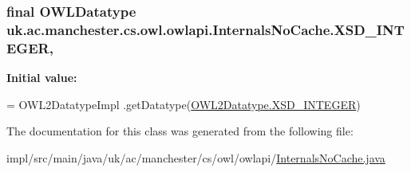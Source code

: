 \hypertarget{classuk_1_1ac_1_1manchester_1_1cs_1_1owl_1_1owlapi_1_1_internals_no_cache_a5109b60810d72a1a3f0802e2477e6999}{
\subsubsection[{X\-S\-D\-\_\-\-I\-N\-T\-E\-G\-E\-R}]{\setlength{\rightskip}{0pt plus 5cm}final {\bf O\-W\-L\-Datatype} uk.\-ac.\-manchester.\-cs.\-owl.\-owlapi.\-Internals\-No\-Cache.\-X\-S\-D\-\_\-\-I\-N\-T\-E\-G\-E\-R\hspace{0.3cm}{\ttfamily [static]}, {\ttfamily [private]}}}\label{classuk_1_1ac_1_1manchester_1_1cs_1_1owl_1_1owlapi_1_1_internals_no_cache_a5109b60810d72a1a3f0802e2477e6999}
{\bfseries Initial value\-:}
\begin{DoxyCode}
= OWL2DatatypeImpl
            .getDatatype(\hyperlink{enumorg_1_1semanticweb_1_1owlapi_1_1vocab_1_1_o_w_l2_datatype_a03ade2b5ecbab9b6b53e4ac8f4c76f9d}{OWL2Datatype.XSD\_INTEGER})
\end{DoxyCode}


The documentation for this class was generated from the following file\-:\begin{DoxyCompactItemize}
\item 
impl/src/main/java/uk/ac/manchester/cs/owl/owlapi/\hyperlink{_internals_no_cache_8java}{Internals\-No\-Cache.\-java}\end{DoxyCompactItemize}
